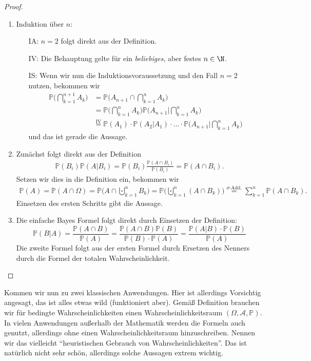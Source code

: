 \begin{proof}
	\begin{enumerate}[label=(\roman*)]
		\item Induktion über $n$:
		\begin{itemize}
			\item[IA:] $n=2$ folgt direkt aus der Definition.
			\item[IV:] \label{IVmult} Die Behauptung gelte für ein \textit{beliebiges}, aber festes $n \in \N$.
			\item[IS:] Wenn wir nun die Induktionsvoraussetzung und den Fall $n=2$ nutzen, bekommen wir 
			\begin{align*}
				\mathbb{P}\Big(\bigcap_{k=1}^{n+1} A_k\Big) &= \mathbb{P}\Big( A_{n+1} \cap \bigcap_{k=1}^{n} A_k\Big)\\
				& = \mathbb{P}\Big(\bigcap_{k=1}^{n} A_k\Big) \mathbb{P}\Big(A_{n+1}\Big |\bigcap_{k=1}^{n} A_k\Big)\\
				& \overset{\text{IV}}{=} \mathbb{P}(A_1)\cdot \mathbb{P}(A_2|A_1)\cdot ... \cdot \mathbb{P}\Big(A_{n+1}\Big|\bigcap_{k=1}^{n} A_k\Big)
			\end{align*}
			und das ist gerade die Aussage.
		\end{itemize}
		\item 
		Zun\"achst folgt direkt aus der Definition
		\begin{align*}
			\mathbb{P}(B_i)\mathbb{P}(A|B_i) = \mathbb{P}(B_i) \frac{\mathbb{P}(A \cap B_i)}{\mathbb{P}(B_i)} = \mathbb{P}(A \cap B_i).
		\end{align*}
		Setzen wir dies in die Definition ein, bekommen wir 
		\begin{align*}
			\mathbb{P}(A) = \mathbb{P}(A \cap \Omega) = \mathbb{P}\Big(A \cap \bigcupdot_{k=1}^{n} B_k\Big) = \mathbb{P}\Big(\bigcupdot_{k=1}^{n} (A \cap B_k)\Big)
			\overset{\sigma\text{-Add.}}{=} \sum\limits_{k=1}^{n} \mathbb{P}(A \cap B_k).
		\end{align*}
		Einsetzen des ersten Schritts gibt die Aussage.
		\item Die einfache Bayes Formel folgt direkt durch Einsetzen der Definition:		
		\[ \mathbb{P}(B|A) = \frac{\mathbb{P}(A \cap B)}{\mathbb{P}(A)} = \frac{\mathbb{P}(A \cap B) \mathbb{P}(B)}{\mathbb{P}(B) \cdot \mathbb{P}(A)} =\frac{\mathbb{P}(A|B) \cdot \mathbb{P}(B)}{\mathbb{P}(A)} \]
		Die zweite Formel folgt aus der ersten Formel durch Ersetzen des Nenners durch die Formel der totalen Wahrscheinlichkeit. 
	\end{enumerate}
\end{proof}
Kommen wir nun zu zwei klassischen Anwendungen. Hier ist allerdings Vorsichtig angesagt, das ist alles etwas wild (funktioniert aber). Gem\"a\ss{} Definition brauchen wir f\"ur bedingte Wahrscheinlichkeiten einen Wahrscheinlichkeitsraum $(\Omega, \mathcal A, \mathbb P)$. In vielen Anwendungen au\ss erhalb der Mathematik werden die Formeln auch genutzt, allerdings ohne einen Wahrscheinlichkeitsraum hinzuschreiben. Nennen wir das vielleicht \enquote{heuristischen Gebrauch von Wahrscheinlichkeiten}. Das ist nat\"urlich nicht sehr sch\"on, allerdings solche Aussagen extrem wichtig. 

